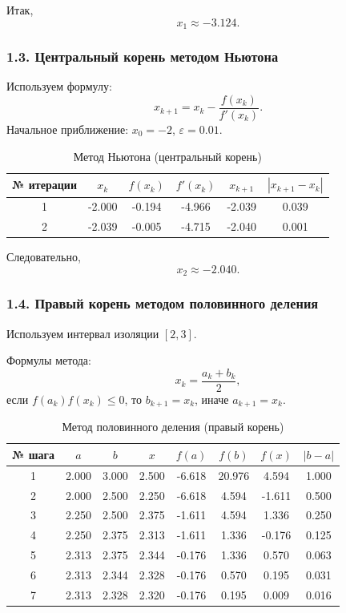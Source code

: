 ﻿\documentclass[12pt,a4paper]{article}
\begin{document}
Итак,
\[
x_1\approx -3.124.
\]

\subsubsection*{1.3. Центральный корень методом Ньютона}
Используем формулу:
\[
x_{k+1}=x_k-\frac{f(x_k)}{f'(x_k)}.
\]
Начальное приближение: $x_0=-2$, $\varepsilon=0.01$.

\begin{table}[H]
\centering
\caption{Метод Ньютона (центральный корень)}
\begin{tabular}{|c|c|c|c|c|c|}
\hline
№ итерации & $x_k$ & $f(x_k)$ & $f'(x_k)$ & $x_{k+1}$ & $|x_{k+1}-x_k|$ \\
\hline
1 & -2.000 & -0.194 & -4.966 & -2.039 & 0.039 \\
\hline
2 & -2.039 & -0.005 & -4.715 & -2.040 & 0.001 \\
\hline
\end{tabular}
\end{table}

Следовательно,
\[
x_2\approx -2.040.
\]

\subsubsection*{1.4. Правый корень методом половинного деления}
Используем интервал изоляции $[2,3]$.

Формулы метода:
\[
x_k=\frac{a_k+b_k}{2},
\]
если $f(a_k)f(x_k)\le0$, то $b_{k+1}=x_k$, иначе $a_{k+1}=x_k$.

\begin{table}[H]
\centering
\caption{Метод половинного деления (правый корень)}
\begin{tabular}{|c|c|c|c|c|c|c|c|}
\hline
№ шага & $a$ & $b$ & $x$ & $f(a)$ & $f(b)$ & $f(x)$ & $|b-a|$ \\
\hline
1 & 2.000 & 3.000 & 2.500 & -6.618 & 20.976 & 4.594 & 1.000 \\
\hline
2 & 2.000 & 2.500 & 2.250 & -6.618 & 4.594 & -1.611 & 0.500 \\
\hline
3 & 2.250 & 2.500 & 2.375 & -1.611 & 4.594 & 1.336 & 0.250 \\
\hline
4 & 2.250 & 2.375 & 2.313 & -1.611 & 1.336 & -0.176 & 0.125 \\
\hline
5 & 2.313 & 2.375 & 2.344 & -0.176 & 1.336 & 0.570 & 0.063 \\
\hline
6 & 2.313 & 2.344 & 2.328 & -0.176 & 0.570 & 0.195 & 0.031 \\
\hline
7 & 2.313 & 2.328 & 2.320 & -0.176 & 0.195 & 0.009 & 0.016 \\
\hline
\end{tabular}
\end{table}
\end{document}
